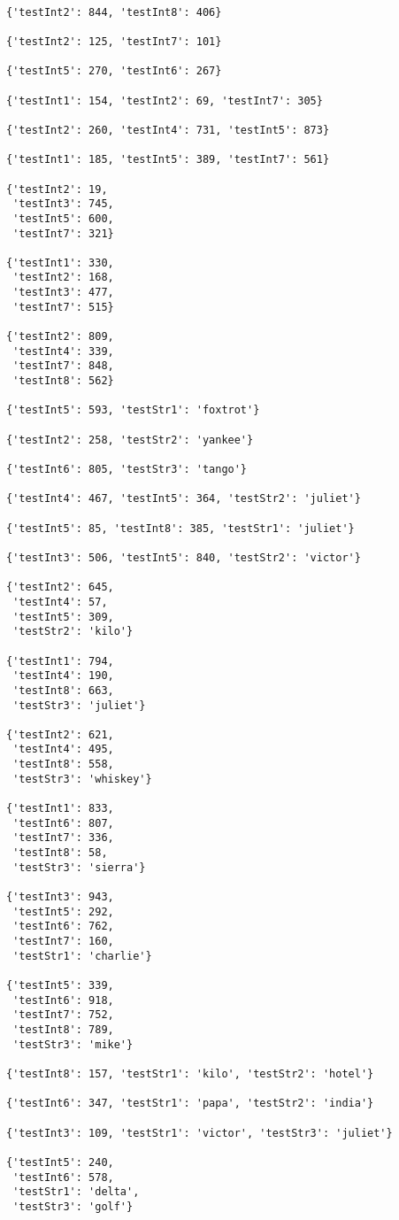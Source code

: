 \begin{lstlisting}

{'testInt2': 844, 'testInt8': 406}

{'testInt2': 125, 'testInt7': 101}

{'testInt5': 270, 'testInt6': 267}

{'testInt1': 154, 'testInt2': 69, 'testInt7': 305}

{'testInt2': 260, 'testInt4': 731, 'testInt5': 873}

{'testInt1': 185, 'testInt5': 389, 'testInt7': 561}

{'testInt2': 19,
 'testInt3': 745,
 'testInt5': 600,
 'testInt7': 321}

{'testInt1': 330,
 'testInt2': 168,
 'testInt3': 477,
 'testInt7': 515}

{'testInt2': 809,
 'testInt4': 339,
 'testInt7': 848,
 'testInt8': 562}

{'testInt5': 593, 'testStr1': 'foxtrot'}

{'testInt2': 258, 'testStr2': 'yankee'}

{'testInt6': 805, 'testStr3': 'tango'}

{'testInt4': 467, 'testInt5': 364, 'testStr2': 'juliet'}

{'testInt5': 85, 'testInt8': 385, 'testStr1': 'juliet'}

{'testInt3': 506, 'testInt5': 840, 'testStr2': 'victor'}

{'testInt2': 645,
 'testInt4': 57,
 'testInt5': 309,
 'testStr2': 'kilo'}

{'testInt1': 794,
 'testInt4': 190,
 'testInt8': 663,
 'testStr3': 'juliet'}

{'testInt2': 621,
 'testInt4': 495,
 'testInt8': 558,
 'testStr3': 'whiskey'}

{'testInt1': 833,
 'testInt6': 807,
 'testInt7': 336,
 'testInt8': 58,
 'testStr3': 'sierra'}

{'testInt3': 943,
 'testInt5': 292,
 'testInt6': 762,
 'testInt7': 160,
 'testStr1': 'charlie'}

{'testInt5': 339,
 'testInt6': 918,
 'testInt7': 752,
 'testInt8': 789,
 'testStr3': 'mike'}

{'testInt8': 157, 'testStr1': 'kilo', 'testStr2': 'hotel'}

{'testInt6': 347, 'testStr1': 'papa', 'testStr2': 'india'}

{'testInt3': 109, 'testStr1': 'victor', 'testStr3': 'juliet'}

{'testInt5': 240,
 'testInt6': 578,
 'testStr1': 'delta',
 'testStr3': 'golf'}


\end{lstlisting}
